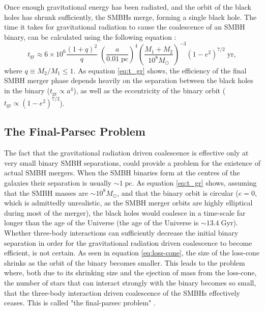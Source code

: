 \documentclass[english, twoside]{HYgradu}
\begin{document}
Once enough gravitational energy has been radiated, and the orbit of the black holes has shrunk sufficiently, the SMBHs merge, forming a single black hole. The time it takes for gravitational radiation to cause the coalescence of an SMBH binary, can be calculated using the following equation \citep{MerrittBook}:
\begin{equation}
t_\mathrm{gr} \approx 6 \times 10^6 \frac{(1+q)^2}{q} \; \left( \frac{a}{0.01 \; \mathrm{pc}} \right)^4 \left( \frac{M_1 + M_2}{10^8 M_\odot} \right)^{-3} (1-e^2)^{7/2} \; \mathrm{yr}, \label{eq:t_gr}
\end{equation}
where $q \equiv M_2/M_1 \leq 1$. As equation \ref{eq:t_gr} shows, the efficiency of the final SMBH merger phase depends heavily on the separation between the black holes in the binary ($t_\mathrm{gr} \propto a^4$), as well as the eccentricity of the binary orbit ($t_\mathrm{gr} \propto (1-e^2)^{7/2}$).

\subsection{The Final-Parsec Problem}

The fact that the gravitational radiation driven coalescence is effective only at very small binary SMBH separations, could provide a problem for the existence of actual SMBH mergers. When the SMBH binaries form at the centres of the galaxies their separation is usually $\sim 1 \; \mathrm{pc}$. As equation \ref{eq:t_gr} shows, assuming that the SMBH masses are $\sim 10^8 M_\odot$, and that the binary orbit is circular ($e = 0$, which is admittedly unrealistic, as the SMBH merger orbits are highly elliptical during most of the merger), the black holes would coalesce in a time-scale far longer than the age of the Universe (the age of the Universe is $\sim 13.4 \; \mathrm{Gyr}$). Whether three-body interactions can sufficiently decrease the initial binary separation in order for the gravitational radiation driven coalescence to become efficient, is not certain. As seen in equation \ref{eq:loss-cone}, the size of the loss-cone shrinks as the orbit of the binary becomes smaller. This leads to the problem where, both due to its shrinking size and the ejection of mass from the loss-cone, the number of stars that can interact strongly with the binary becomes so small, that the three-body interaction driven coalescence of the SMBHs effectively ceases. This is called "the final-parsec problem" \citep{Milosavljevic2003}.
\end{document}
